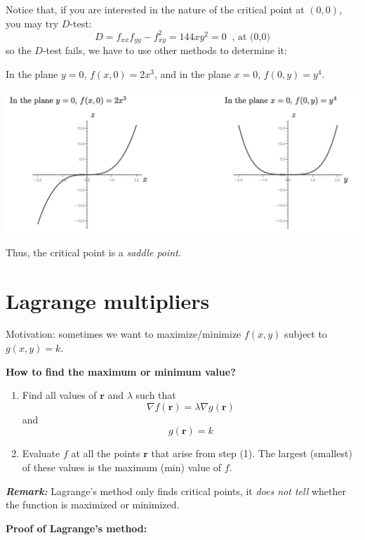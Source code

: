 \documentclass[11pt, a4paper]{MATH2023}
\begin{document}
\begin{spacing}{1.3}
    \vspace{0.5in}
    Notice that, if you are interested in the nature of the critical point at $(0,0)$, you may try $D$-test:
    $$D=f_{xx}f_{yy}-f_{xy}^2=144xy^2=0\ \text{\ ,\ at (0,0)}$$
    so the $D$-test fails, we have to use other methods to determine it:

    In the plane $y=0$, $f(x,0)=2x^3$, and in the plane $x=0$, $f(0,y)=y^4$.
    \begin{center}
        \includegraphics[scale=0.46]{images/Ch13-ex1.4.png}
    \end{center}
    Thus, the critical point is a {\it saddle point.}


    \newpage
    \section{Lagrange multipliers}

    {\blue Motivation: sometimes we want to maximize/minimize $f(x,y)$ subject to $g(x,y)=k$.}

    {\bf How to find the maximum or minimum value?}
    \begin{enumerate}
        \item Find all values of $\mathbf{r}$ and $\lambda$ such that
        $$\nabla f(\mathbf{r})=\lambda \nabla g(\mathbf{r})$$
        and $$g(\mathbf{r})=k$$
        \item Evaluate $f$ at all the points $\mathbf{r}$ that arise from step (1). 
        The largest (smallest) of these values is the maximum (min) value of $f$.
    \end{enumerate}

    {\it \textbf{Remark:}} Lagrange's method only finds critical points, 
    it {\it does not tell} whether the function is maximized or minimized.

    \vspace{0.5in}
    {\bf Proof of Lagrange's method:}


\end{spacing}
\end{document}
